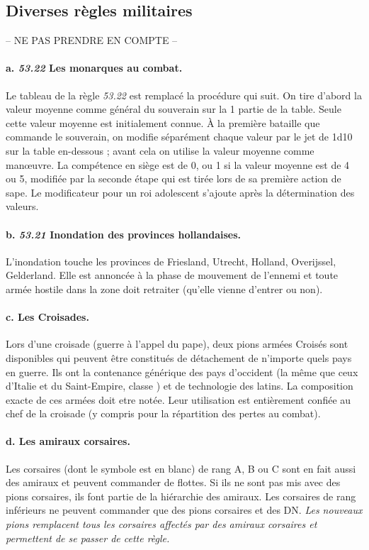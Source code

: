 \subsection{Diverses règles militaires}
-- NE PAS PRENDRE EN COMPTE --


\paragraph{a. \textit{53.22} Les monarques au combat.}

Le tableau de la règle \textit{53.22} est remplacé la procédure
qui suit. On tire d'abord la valeur moyenne comme général du souverain
sur la 1 partie de la table. Seule cette valeur moyenne est initialement
connue. À la première bataille que commande le souverain, on modifie
séparément chaque valeur
par le jet de 1d10 sur la table en-dessous ; avant cela on utilise
la valeur moyenne comme man{\oe}uvre.
La compétence en siège est de 0, ou 1 si la valeur moyenne est de 4 ou 5, modifiée par
la seconde étape qui est tirée lors de sa première action de sape.
Le modificateur pour un roi adolescent s'ajoute après la détermination des valeurs.

\paragraph{b. \textit{53.21} Inondation des provinces hollandaises.}
L'inondation touche les provinces de Friesland, Utrecht, Holland,
Overijssel, Gelderland.
Elle est annoncée à la phase de mouvement de l'ennemi et toute armée hostile
dans la zone doit retraiter (qu'elle vienne d'entrer ou non).


\paragraph{c. Les Croisades.}
Lors d'une croisade (guerre à l'appel du pape), deux pions armées Croisés
sont disponibles qui peuvent être constitués de détachement de n'importe
quels pays en guerre. Ils ont la contenance générique des pays d'occident (la
même que ceux d'Italie et du Saint-Empire, classe \CAIII) et de technologie
des latins.
La composition exacte de ces armées doit etre notée. Leur utilisation est
entièrement confiée au chef de la croisade (y compris pour la
répartition des pertes au combat).

\paragraph{d. Les amiraux corsaires.}
Les corsaires (dont le symbole est en blanc) de rang A, B ou C
sont en fait aussi des amiraux et peuvent commander de flottes.
Si ils ne sont pas mis avec
des pions corsaires, ils font partie de la hiérarchie des amiraux.
Les corsaires de rang inférieurs ne peuvent commander que des
pions corsaires et des DN.
\textit{Les nouveaux pions remplacent tous les corsaires affectés
par des amiraux corsaires et permettent de se passer de cette règle.}

